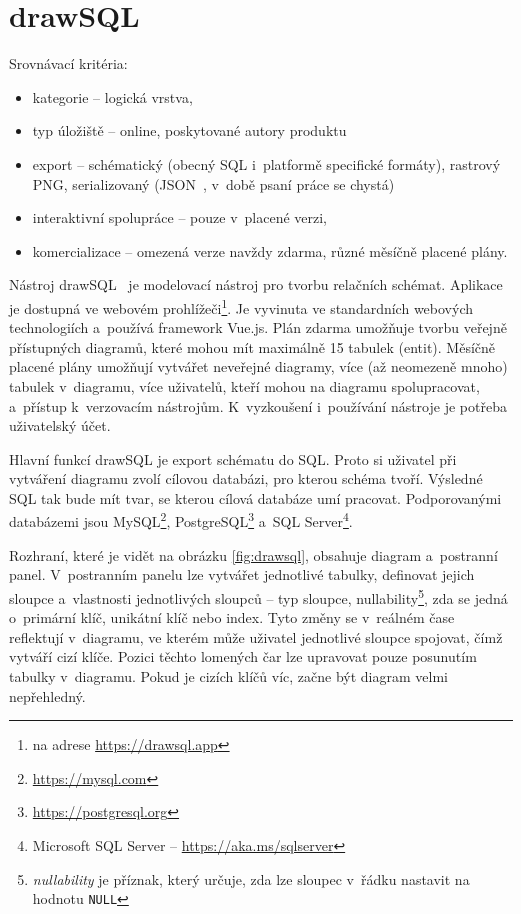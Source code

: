 \section{drawSQL}

Srovnávací kritéria:
\begin{itemize}
  \item kategorie -- logická vrstva,
  \item typ úložiště -- online, poskytované autory produktu
  \item export -- schématický (obecný SQL i~platformě specifické formáty),
  rastrový PNG, serializovaný (JSON~\cite{json2017}, v~době psaní práce se
  chystá)
  \item interaktivní spolupráce -- pouze v~placené verzi,
  \item komercializace -- omezená verze navždy zdarma, různé měsíčně placené
  plány.
\end{itemize}

Nástroj drawSQL~\cite{drawsql21} je modelovací nástroj pro tvorbu relačních
schémat. Aplikace je dostupná ve webovém prohlížeči\footnote{na adrese
\url{https://drawsql.app}}. Je vyvinuta ve standardních webových technologiích
a~používá framework Vue.js. Plán zdarma umožňuje tvorbu veřejně přístupných
diagramů, které mohou mít maximálně 15 tabulek (entit). Měsíčně placené plány
umožňují vytvářet neveřejné diagramy, více (až neomezeně mnoho) tabulek
v~diagramu, více uživatelů, kteří mohou na diagramu spolupracovat, a~přístup
k~verzovacím nástrojům. K~vyzkoušení i~používání nástroje je potřeba uživatelský
účet.

Hlavní funkcí drawSQL je export schématu do SQL. Proto si uživatel při vytváření
diagramu zvolí cílovou databázi, pro kterou schéma tvoří. Výsledné SQL tak bude
mít tvar, se kterou cílová databáze umí pracovat. Podporovanými databázemi jsou
MySQL\footnote{\url{https://mysql.com}},
PostgreSQL\footnote{\url{https://postgresql.org}} a~SQL
Server\footnote{Microsoft SQL Server -- \url{https://aka.ms/sqlserver}}.

Rozhraní, které je vidět na obrázku \ref{fig:drawsql}, obsahuje diagram
a~postranní panel. V~postranním panelu lze vytvářet jednotlivé tabulky,
definovat jejich sloupce a~vlastnosti jednotlivých sloupců -- typ sloupce,
nullability\footnote{\emph{nullability} je příznak, který určuje, zda lze sloupec
v~řádku nastavit na hodnotu \texttt{NULL}}, zda se jedná o~primární klíč, unikátní klíč
nebo index. Tyto změny se v~reálném čase reflektují v~diagramu, ve kterém může
uživatel jednotlivé sloupce spojovat, čímž vytváří cizí klíče. Pozici těchto
lomených čar lze upravovat pouze posunutím tabulky v~diagramu. Pokud je cizích
klíčů víc, začne být diagram velmi nepřehledný.

